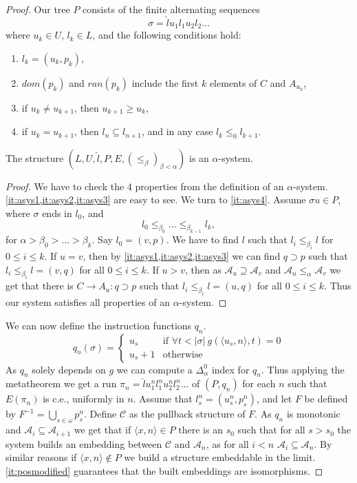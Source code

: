 \documentclass[10pt,a4paper]{amsart}
\newcommand\+[1]{\mathcal{#1}}
\renewcommand\*[1]{\mathbf{#1}}
\renewcommand\=[1]{\text{#1}}
\renewcommand\*[1]{\mathbf{#1}}
\newcommand{\A}{\mathcal{A}}
\newcommand{\mc}[1]{\mathcal{#1}}
\newcommand{\ra}{\rightarrow}
\begin{document}
\begin{proof}
Our tree $P$ consists of the finite alternating sequences
\[ \sigma=\hat lu_1l_1u_2l_2\dots\]
where $u_k\in U$, $l_k\in L$, and the following conditions hold:
\begin{enumerate}[label=(\alph*)]
    \item $l_k=(u_k,p_k)$,
    \item\label{it:posmodified} $dom(p_k)$ and $ran(p_k)$ include the first $k$ elements of $C$ and $A_{u_k}$,
    \item if $u_k\neq u_{k+1}$, then $u_{k+1}\geq u_k$,
    \item if $u_k=u_{k+1}$, then $l_n\subseteq l_{n+1}$, and in any case $l_k\leq_0 l_{k+1}$.
\end{enumerate}
\begin{claim}
 The structure $(L,U,\hat l, P,E,(\leq_\beta)_{\beta<\alpha})$ is an $\alpha$-system.
\end{claim}
\begin{proof}
We have to check the $4$ properties from the definition of an $\alpha$-system. \cref{it:asys1,it:asys2,it:asys3} are easy to see. We turn to \cref{it:asys4}. Assume $\sigma u\in P$, where $\sigma$ ends in $l_0$, and
\[ l_0\leq_{\beta_0}\dots \leq_{\beta_{k-1}} l_k,\]
for $\alpha>\beta_0>\dots>\beta_k$. Say $l_0=(v,p)$. We have to find $l$ such that $l_i\leq_{\beta_i} l$ for $0\leq i\leq k$. If $u=v$, then by \cref{it:asys1,it:asys2,it:asys3} we can find $q\supset p$ such that $l_i \leq_{\beta_i} l=(v,q)$ for all $0\leq i\leq k$. If $u>v$, then as $\A_{u} \supseteq \A_v$ and $\A_{u}\leq_{\alpha}\A_{v}$ we get that there is $C\ra A_u:q \supset p$ such that $l_i\leq_{\beta_i}l=(u,q)$ for all $0\leq i\leq k$. Thus our system satisfies all properties of an $\alpha$-system.
\end{proof}
We can now define the instruction functions $q_n$.
\[ q_n(\sigma)=\begin{cases}
u_s & \text{if } \forall t< |\sigma|\ g(\langle u_s,n\rangle,t)=0\\
u_s+1 &\text{otherwise}
\end{cases}\]
As $q_n$ solely depends on $g$ we can compute a $\Delta_\alpha^0$ index for $q_n$. Thus applying the metatheorem we get a run $\pi_n=\hat l u_1^n l_1^n u_2^n l_2^n\dots$ of $(P,q_n)$ for each $n$ such that $E(\pi_n)$ is c.e., uniformly in $n$.
Assume that $l_s^n=(u_s^n,p_s^n)$, and let $F$ be defined by $F^{-1}=\bigcup_{s\in \omega} p_s^{n}$. Define $\mc C$ as the pullback structure of $F$. As $q_n$ is monotonic and $\A_i\subseteq \A_{i+1}$ we get that if $\langle x,n\rangle\in P$ there is an $s_0$ such that for all $s>s_0$ the system builds an embedding between $\mc C$ and $\mc A_n$, as for all $i<n$ $\A_i\subseteq \A_n$. By similar reasons if $\langle x,n\rangle\not \in P$ we build a structure embeddable in the limit. \cref{it:posmodified} guarantees that the built embeddings are isomorphisms.
\end{proof}
\end{document}
